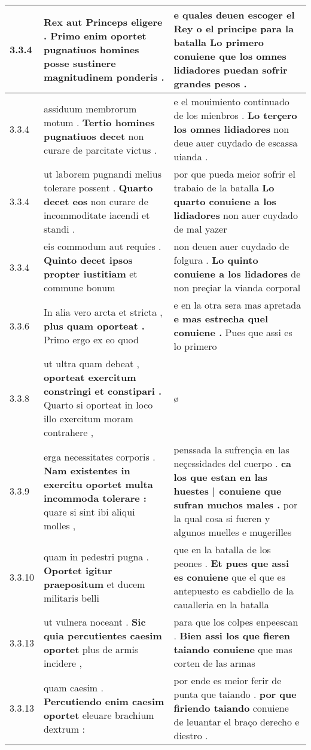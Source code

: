 \begin{tabular}{|p{1cm}|p{6.5cm}|p{6.5cm}|}
3.3.4 & Rex aut Princeps eligere . \textbf{ Primo enim oportet pugnatiuos homines posse } sustinere magnitudinem ponderis . & e quales deuen escoger el Rey o el principe para la batalla \textbf{ Lo primero conuiene } que los omnes lidiadores puedan sofrir grandes pesos . \\\hline
3.3.4 & assiduum membrorum motum . \textbf{ Tertio homines pugnatiuos decet } non curare de parcitate victus . & e el mouimiento continuado de los mienbros . \textbf{ Lo terçero los omnes lidiadores } non deue auer cuydado de escassa uianda . \\\hline
3.3.4 & ut laborem pugnandi melius tolerare possent . \textbf{ Quarto decet eos } non curare de incommoditate iacendi et standi . & por que pueda meior sofrir el trabaio de la batalla \textbf{ Lo quarto conuiene a los lidiadores } non auer cuydado de mal yazer \\\hline
3.3.4 & eis commodum aut requies . \textbf{ Quinto decet ipsos propter iustitiam } et commune bonum & non deuen auer cuydado de folgura . \textbf{ Lo quinto conuiene a los lidadores } de non preçiar la vianda corporal \\\hline
3.3.6 & In alia vero arcta et stricta , \textbf{ plus quam oporteat . } Primo ergo ex eo quod & e en la otra sera mas apretada \textbf{ e mas estrecha quel conuiene . } Pues que assi es lo primero \\\hline
3.3.8 & ut ultra quam debeat , \textbf{ oporteat exercitum constringi et constipari . } Quarto si oporteat in loco illo exercitum moram contrahere , & ø \\\hline
3.3.9 & erga necessitates corporis . \textbf{ Nam existentes in exercitu oportet multa incommoda tolerare : } quare si sint ibi aliqui molles , & penssada la sufrençia en las neçessidades del cuerpo . \textbf{ ca los que estan en las huestes | conuiene que sufran muchos males . } por la qual cosa si fueren y algunos muelles e mugerilles \\\hline
3.3.10 & quam in pedestri pugna . \textbf{ Oportet igitur praepositum } et ducem militaris belli & que en la batalla de los peones . \textbf{ Et pues que assi es conuiene } que el que es antepuesto es cabdiello de la caualleria en la batalla \\\hline
3.3.13 & ut vulnera noceant . \textbf{ Sic quia percutientes caesim oportet } plus de armis incidere , & para que los colpes enpeescan . \textbf{ Bien assi los que fieren taiando conuiene } que mas corten de las armas \\\hline
3.3.13 & quam caesim . \textbf{ Percutiendo enim caesim oportet } eleuare brachium dextrum : & por ende es meior ferir de punta que taiando . \textbf{ por que firiendo taiando } conuiene de leuantar el braço derecho e diestro . \\\hline

\end{tabular}
